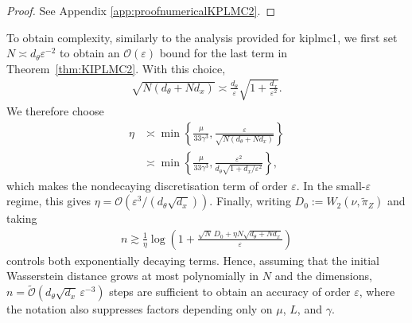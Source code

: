 \begin{proof}
See Appendix \ref{app:proofnumericalKPLMC2}.
\end{proof}


To obtain complexity, similarly to the analysis provided for \gls*{kiplmc1}, we first set $N\asymp d_\theta\varepsilon^{-2}$ to obtain an $\mathcal{O}(\varepsilon)$ bound for the last term in Theorem~\ref{thm:KIPLMC2}.  With this choice,
\begin{align*}
\sqrt{N(d_\theta+Nd_x)}
\asymp\frac{d_\theta}{\varepsilon}
\sqrt{1+\frac{d_x}{\varepsilon^2}}.
\end{align*}
We therefore choose
\begin{align*}
\eta
&\asymp\min\left\{\frac{\mu}{33\gamma^3},
\frac{\varepsilon}{\sqrt{N(d_\theta+Nd_x)}}\right\}\\
&\asymp\min\left\{\frac{\mu}{33\gamma^3},
\frac{\varepsilon^2}
{d_\theta\sqrt{1+d_x/\varepsilon^2}}\right\},
\end{align*}
which makes the nondecaying discretisation term of order $\varepsilon$.  In the small-$\varepsilon$ regime, this gives $\eta=\mathcal{O}(\varepsilon^3/(d_\theta\sqrt{d_x}))$.  Finally, writing $D_0:=W_2(\nu,\widetilde\pi_Z)$ and taking
\begin{align*}
n\gtrsim\frac{1}{\eta}
\log\left(1+\frac{\sqrt N\,D_0
+\eta N\sqrt{d_\theta+Nd_x}}{\varepsilon}\right)
\end{align*}
controls both exponentially decaying terms.  Hence, assuming that the initial Wasserstein distance grows at most polynomially in $N$ and the dimensions, $n=\widetilde{\mathcal{O}}(d_\theta\sqrt{d_x}\,\varepsilon^{-3})$ steps are sufficient to obtain an accuracy of order $\varepsilon$, where the notation also suppresses factors depending only on $\mu$, $L$, and $\gamma$.

\begin{table}[t]
    \centering
    \def \arraystretch{1}
    \caption{Comparison of orders required to achieve an error of order $\varepsilon$ in $W_2$, for step count, particle number $N$ and step size $\eta$.}
    \label{tab:err_rate}
\end{table}

